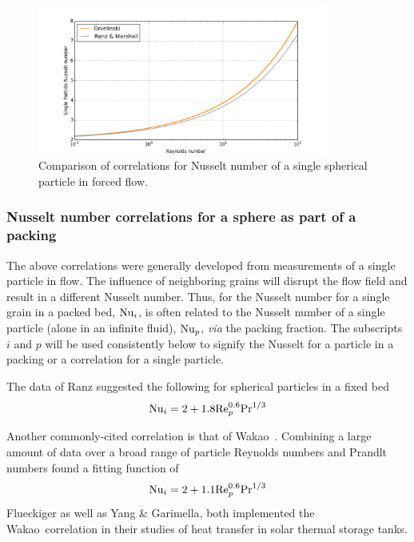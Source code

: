 \begin{figure}[ht]
    \centering
    \includegraphics[width=0.85\textwidth]{figures/Nusselt-single}
    \caption{Comparison of correlations for Nusselt number of a single spherical particle in forced flow.}
    \label{fig:Nu-single}
\end{figure}





\subsubsection{Nusselt number correlations for a sphere as part of a packing}
The above correlations were generally developed from measurements of a single particle in flow. The influence of neighboring grains will disrupt the flow field and result in a different Nusselt number. Thus, for the Nusselt number for a single grain in a packed bed, $\mathrm{Nu}_i$, is often related to the Nusselt number of a single particle (alone in an infinite fluid), $\mathrm{Nu}_p$, \textit{via} the packing fraction. The subscripts $i$ and $p$ will be used consistently below to signify the Nusselt for a particle in a packing or a correlation for a single particle. 

The data of Ranz suggested the following for spherical particles in a fixed bed
\begin{equation}\label{eq:ranz-packing}
    \mathrm{Nu}_i = 2 + 1.8\mathrm{Re}_p^{0.6} \mathrm{Pr}^{1/3}
\end{equation}

Another commonly-cited correlation is that of Wakao\etal~\cite{Wakao1978,wakao1982heat}. Combining a large amount of data over a broad range of particle Reynolds numbers and Prandlt numbers found a fitting function of
\begin{equation}\label{eq:wakao}
    \mathrm{Nu}_i = 2 + 1.1\mathrm{Re}_p^{0.6} \mathrm{Pr}^{1/3}
\end{equation}
Flueckiger\etal \cite{Flueckiger2014,Flueckiger2011a,Flueckiger2011} as well as Yang \& Garimella\cite{Yang2010}, both implemented the Wakao\etal~correlation in their studies of heat transfer in solar thermal storage tanks. 

